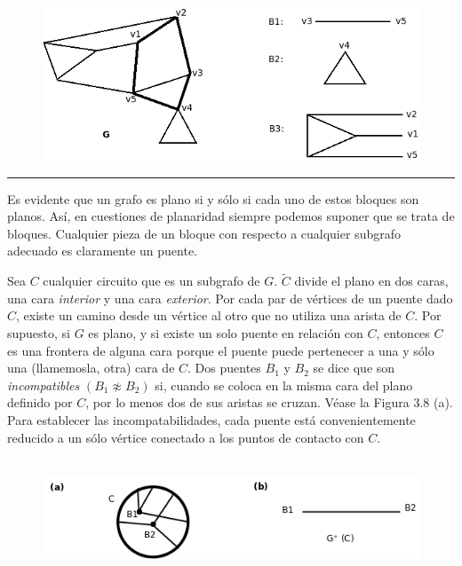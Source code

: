 \documentclass[10pt,a5paper]{book}
\begin{document}
\begin{figure}[H]
\caption{ }
\hrulefill{}\\
\hspace*{-.2in}\includegraphics[scale=.55]{Fig3_7.png}
\end{figure}
\hrule{}

Es evidente que un grafo es plano si y sólo si cada uno de estos bloques son planos. Así, en cuestiones de planaridad siempre podemos suponer que se trata de bloques. Cualquier pieza de un bloque con respecto a cualquier subgrafo adecuado es claramente un puente.

Sea $C$ cualquier circuito que es un subgrafo de $G$. $\widetilde{C}$ divide el plano en dos caras, una cara \emph{interior} y una cara \emph{exterior}. Por cada par de vértices de un puente dado $C$, existe un camino desde un vértice al otro que no utiliza una arista de $C$. Por supuesto, si $G$ es plano, y si existe un solo puente en relación con $C$, entonces $C$ es una frontera de alguna cara porque el puente puede pertenecer a una y sólo una (llamemosla, otra) cara de $C$. Dos puentes $B_1$ y $B_2$ se dice que son \emph{incompatibles} $(B_1 \not \approx B_2)$ si, cuando se coloca en la misma cara del plano definido por $C$, por lo menos dos de sus aristas se cruzan. Véase la Figura 3.8 (a). Para establecer las incompatabilidades, cada puente está convenientemente reducido a un sólo vértice conectado a los puntos de contacto con $C$.

\vfill
\nopagebreak
\begin{figure}[H]
\caption{ }
\hrulefill{}\\
\hspace*{-.7in}\includegraphics[scale=.5]{Fig3_8.png}
\end{figure}
\hrulefill{}\\
\end{document}
